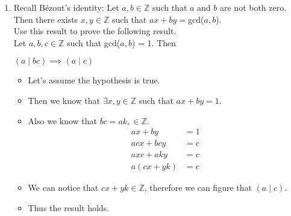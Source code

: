 \documentclass[letterpaper,12pt]{article}
\begin{document}
\begin{enumerate}
\begin{itemize}
\end{itemize}
\item Recall B\'ezout's identity: Let $a,b \in \mathbb{Z}$ such that $a$ and $b$ are not both zero. Then there exists $x,y \in \mathbb{Z}$ such that $ax+by = $gcd($a,b$). \\Use this result to prove the following result. \\ Let $a,b,c \in  \mathbb{Z}$ such that gcd($a,b$) = 1. Then
\begin{center}
	$(a\mid bc) \implies (a \mid c)$
\end{center}
\begin{itemize}
	\item Let's assume the hypothesis is true.
	\item Then we know that $\exists x,y \in \mathbb{Z}$ such that $ax+by=1$.
	\item Also we know that $bc = ak , \in \mathbb{Z}$.
	\begin{align}
		ax+by &= 1 \\ acx + bcy &= c \\ axc +aky &=c \\ a(cx+yk)&=c
	\end{align}
	\item We can notice that $cx+yk \in \mathbb{Z}$, therefore we can figure that $(a\mid c).$
	\item Thus the result holds.
	

\end{itemize}
\end{enumerate}
\end{document}
